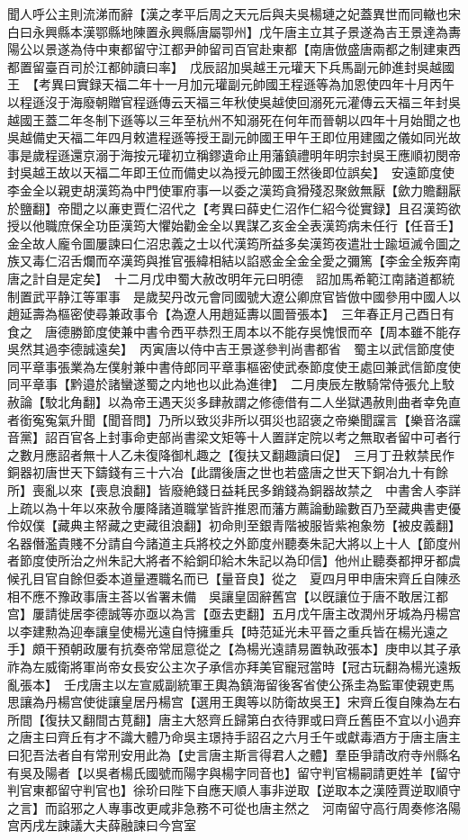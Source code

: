 聞人呼公主則流涕而辭【漢之孝平后周之天元后與夫吳楊璉之妃蓋異世而同轍也宋白曰永興縣本漢鄂縣地陳置永興縣唐屬卾州】戊午唐主立其子景遂為吉王景達為夀陽公以景遂為侍中東都留守江都尹帥留司百官赴東都【南唐倣盛唐兩都之制建東西都置留臺百司於江都帥讀曰率】　戊辰詔加吳越王元瓘天下兵馬副元帥進封吳越國王　【考異曰實録天福二年十一月加元瓘副元帥國王程遜等為加恩使四年十月丙午以程遜沒于海廢朝贈官程遜傳云天福三年秋使吳越使回溺死元灌傳云天福三年封吳越國王蓋二年冬制下遜等以三年至杭州不知溺死在何年而晉朝以四年十月始聞之也吳越備史天福二年四月敕遣程遜等授王副元帥國王甲午王即位用建國之儀如同光故事是歲程遜還京溺于海按元瓘初立稱鏐遺命止用藩鎮禮明年明宗封吳王應順初閔帝封吳越王故以天福二年即王位而備史以為授元帥國王然後即位誤矣】　安遠節度使李金全以親吏胡漢筠為中門使軍府事一以委之漢筠貪猾殘忍聚斂無厭【歛力贍翻厭於鹽翻】帝聞之以亷吏賈仁沼代之【考異曰薛史仁沼作仁紹今從實録】且召漢筠欲授以他職庶保全功臣漢筠大懼始勸金全以異謀乙亥金全表漢筠病未任行【任音壬】金全故人龐令圖屢諫曰仁沼忠義之士以代漢筠所益多矣漢筠夜遣壯士踰垣滅令圖之族又毒仁沼舌爛而卒漢筠與推官張緯相結以諂惑金全金全愛之彌篤【李金全叛奔南唐之計自是定矣】　十二月戊申蜀大赦改明年元曰明德　詔加馬希範江南諸道都統制置武平静江等軍事　是歲契丹改元會同國號大遼公卿庶官皆倣中國參用中國人以趙延壽為樞密使尋兼政事令【為遼人用趙延夀以圖晉張本】　三年春正月己酉日有食之　唐德勝節度使兼中書令西平恭烈王周本以不能存吳愧恨而卒【周本雖不能存吳然其過李德誠遠矣】　丙寅唐以侍中吉王景遂參判尚書都省　蜀主以武信節度使同平章事張業為左僕射兼中書侍郎同平章事樞密使武泰節度使王處回兼武信節度使同平章事【黔邉於諸蠻遂蜀之内地也以此為進律】　二月庚辰左散騎常侍張允上駮赦論【駮北角翻】以為帝王遇天災多肆赦謂之修德借有二人坐獄遇赦則曲者幸免直者銜寃寃氣升聞【聞音問】乃所以致災非所以弭災也詔褒之帝樂聞讜言【樂音洛讜音黨】詔百官各上封事命吏部尚書梁文矩等十人置詳定院以考之無取者留中可者行之數月應詔者無十人乙未復降御札趣之【復扶又翻趣讀曰促】　三月丁丑敕禁民作銅器初唐世天下鑄錢有三十六冶【此謂後唐之世也若盛唐之世天下銅冶九十有餘所】喪亂以來【喪息浪翻】皆廢絶錢日益耗民多銷錢為銅器故禁之　中書舍人李詳上疏以為十年以來赦令屢降諸道職掌皆許推恩而藩方薦論動踰數百乃至藏典書吏優伶奴僕【藏典主帑藏之吏藏徂浪翻】初命則至銀青階被服皆紫袍象笏【被皮義翻】名器僭濫貴賤不分請自今諸道主兵將校之外節度州聽奏朱記大將以上十人【節度州者節度使所治之州朱記大將者不給銅印給木朱記以為印信】他州止聽奏都押牙都虞候孔目官自餘但委本道量遷職名而已【量音良】從之　夏四月甲申唐宋齊丘自陳丞相不應不豫政事唐主荅以省署未備　吳讓皇固辭舊宫【以旣讓位于唐不敢居江都宫】屢請徙居李德誠等亦亟以為言【亟去吏翻】五月戊午唐主改潤州牙城為丹楊宫以李建勲為迎奉讓皇使楊光遠自恃擁重兵【時范延光未平晉之重兵皆在楊光遠之手】頗干預朝政屢有抗奏帝常屈意從之【為楊光遠請易置執政張本】庚申以其子承祚為左威衛將軍尚帝女長安公主次子承信亦拜美官寵冠當時【冠古玩翻為楊光遠叛亂張本】　壬戌唐主以左宣威副統軍王輿為鎮海留後客省使公孫圭為監軍使親吏馬思讓為丹楊宫使徙讓皇居丹楊宫【選用王輿等以防衛故吳王】宋齊丘復自陳為左右所間【復扶又翻間古莧翻】唐主大怒齊丘歸第白衣待罪或曰齊丘舊臣不宜以小過弃之唐主曰齊丘有才不識大體乃命吳主璟持手詔召之六月壬午或獻毒酒方于唐主唐主曰犯吾法者自有常刑安用此為【史言唐主斯言得君人之體】羣臣爭請改府寺州縣名有吳及陽者【以吳者楊氏國號而陽字與楊字同音也】留守判官楊嗣請更姓羊【留守判官東都留守判官也】徐玠曰陛下自應天順人事非逆取【逆取本之漢陸賈逆取順守之言】而諂邪之人專事改更咸非急務不可從也唐主然之　河南留守高行周奏修洛陽宫丙戌左諫議大夫薛融諫曰今宫室